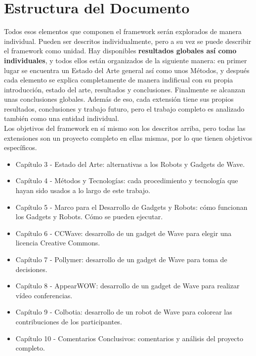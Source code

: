 \section{Estructura del Documento}
Todos esos elementos que componen el framework serán explorados de manera individual. Pueden ser descritos individualmente, pero a su vez se puede describir el framework como unidad. Hay disponibles \textbf{resultados globales así como individuales}, y todos ellos están organizados de la siguiente manera: en primer lugar se encuentra un Estado del Arte general así como unos Métodos, y después cada elemento se explica completamente de manera indificual con su propia introducción, estado del arte, resultados y conclusiones. Finalmente se alcanzan unas conclusiones globales. Además de eso, cada extensión tiene sus propios resultados, conclusiones y trabajo futuro, pero el trabajo completo es analizado también como una entidad individual.\\[.2cm]
Los objetivos del framework en sí mismo son los descritos arriba, pero todas las extensiones son un proyecto completo en ellas mismas, por lo que tienen objetivos específicos.
\begin{itemize}
  \item Capítulo 3 - Estado del Arte: alternativas a los Robots y Gadgets de Wave.
  \item Capítulo 4 - Métodos y Tecnologías: cada procedimiento y tecnología que hayan sido usados a lo largo de este trabajo.
  \item Capítulo 5 - Marco para el Desarrollo de Gadgets y Robots: cómo funcionan los Gadgets y Robots. Cómo se pueden ejecutar.
  \item Capítulo 6 - CCWave: desarrollo de un gadget de Wave para elegir una licencia Creative Commons.
  \item Capítulo 7 - Pollymer: desarrollo de un gadget de Wave para toma de decisiones.
  \item Capítulo 8 - AppearWOW: desarrollo de un gadget de Wave para realizar vídeo conferencias.
  \item Capítulo 9 - Colbotia: desarrollo de un robot de Wave para colorear las contribuciones de los participantes.
  \item Capítulo 10 - Comentarios Conclusivos: comentarios y análisis del proyecto completo.
\end{itemize}
